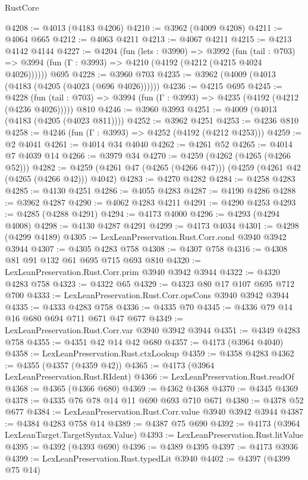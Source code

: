 \begin{lexlean}{RustCore}
\begin{coremodule}
@4208 := @4013 (@4183 @4206)
@4210 := @3962 (@4009 @4208)
@4211 := @4064 @665
@4212 := @4063 @4211
@4213 := @4067 @4211
@4215 := @4213 @4142 @4144
@4227 := @4204
    (fun (lets : @3990) =>
    @3992
      (fun (tail : @703) => @3994 (fun (Γ : @3993) => @4210 (@4192 (@4212 (@4215 @4024 @4026))))))
    @695
@4228 := @3960 @703
@4235 := @3962 (@4009 (@4013 (@4183 (@4205 (@4023 (@696 @4026))))))
@4236 := @4215 @695
@4245 := @4228
    (fun (tail : @703) => @3994 (fun (Γ : @3993) => @4235 (@4192 (@4212 (@4236 @4026)))))
    @810
@4246 := @3960 @3993
@4251 := @4009 (@4013 (@4183 (@4205 (@4023 @811))))
@4252 := @3962 @4251
@4253 := @4236 @810
@4258 := @4246 (fun (Γ : @3993) => @4252 (@4192 (@4212 @4253)))
@4259 := @2 @4041
@4261 := @4014 @34 @4040
@4262 := @4261 @52
@4265 := @4014 @7 @4039 @14
@4266 := @3979 @34
@4270 := @4259 (@4262 (@4265 (@4266 @52)))
@4282 := @4259 (@4261 @47 (@4265 (@4266 @47))) (@4259 (@4261 @42 (@4265 (@4266 @42))) @4042)
@4283 := @4270 @4282
@4284 := @4258 @4283
@4285 := @4130 @4251
@4286 := @4055 @4283
@4287 := @4190 @4286
@4288 := @3962 @4287
@4290 := @4062 @4283 @4211
@4291 := @4290 @4253
@4293 := @4285 (@4288 @4291)
@4294 := @4173 @4000
@4296 := @4293 (@4294 @4008)
@4298 := @4130 @4287 @4291
@4299 := @4173 @4034
@4301 := @4298 (@4299 @4189)
@4305 := LexLeanPreservation.Rust.Corr.cond @3940 @3942 @3944
@4307 := @4305 @4283 @758
@4308 := @4307 @758
@4316 := @4308 @81 @91 @132 @61 @695 @715 @693 @810
@4320 := LexLeanPreservation.Rust.Corr.prim @3940 @3942 @3944
@4322 := @4320 @4283 @758
@4323 := @4322 @65
@4329 := @4323 @80 @17 @107 @695 @712 @700
@4333 := LexLeanPreservation.Rust.Corr.opsCons @3940 @3942 @3944
@4335 := @4333 @4283 @758
@4336 := @4335 @70
@4345 := @4336 @79 @14 @16 @680 @694 @711 @671 @47 @677
@4349 := LexLeanPreservation.Rust.Corr.var @3940 @3942 @3944
@4351 := @4349 @4283 @758
@4355 := @4351 @42 @14 @42 @680
@4357 := @4173 (@3964 @4040)
@4358 := LexLeanPreservation.Rust.ctxLookup
@4359 := @4358 @4283
@4362 := @4355 (@4357 (@4359 @42))
@4365 := @4173 (@3964 LexLeanPreservation.Rust.RIdent)
@4366 := LexLeanPreservation.Rust.readOf
@4368 := @4365 (@4366 @680)
@4369 := @4362 @4368
@4370 := @4345 @4369
@4378 := @4335 @76 @78 @14 @11 @690 @693 @710 @671
@4380 := @4378 @52 @677
@4384 := LexLeanPreservation.Rust.Corr.value @3940 @3942 @3944
@4387 := @4384 @4283 @758 @14
@4389 := @4387 @75 @690
@4392 := @4173 (@3964 LexLeanTarget.TargetSyntax.Value)
@4393 := LexLeanPreservation.Rust.litValue
@4395 := @4392 (@4393 @690)
@4396 := @4389 @4395
@4397 := @4173 @3936
@4399 := LexLeanPreservation.Rust.typedLit @3940
@4402 := @4397 (@4399 @75 @14)

\end{coremodule}
\end{lexlean}

